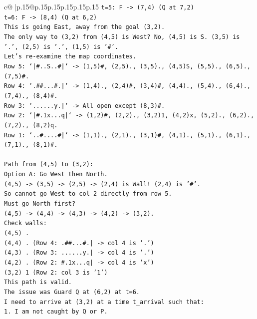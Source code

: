 \documentclass{article}
\begin{document}
{\begin{supertabular}{c@{$\;$}|p{.15\linewidth}@{}p{.15\linewidth}p{.15\linewidth}p{.15\linewidth}p{.15\linewidth}p{.15\linewidth}}
{{{\texttt{t=5: F {-}> (7,4) (Q at 7,2)} \\
\texttt{t=6: F {-}> (8,4) (Q at 6,2)} \\
\texttt{This is going East, away from the goal (3,2).} \\
\texttt{The only way to (3,2) from (4,5) is West? No, (4,5) is S. (3,5) is '.', (2,5) is '.', (1,5) is '\#'.} \\
\texttt{Let's re{-}examine the map coordinates.} \\
\texttt{Row 5: `|\#..S..\#|` {-}> (1,5)\#, (2,5)., (3,5)., (4,5)S, (5,5)., (6,5)., (7,5)\#.} \\
\texttt{Row 4: `.\#\#...\#.|` {-}> (1,4)., (2,4)\#, (3,4)\#, (4,4)., (5,4)., (6,4)., (7,4)., (8,4)\#.} \\
\texttt{Row 3: `......y.|` {-}> All open except (8,3)\#.} \\
\texttt{Row 2: `|\#.1x...q|` {-}> (1,2)\#, (2,2)., (3,2)1, (4,2)x, (5,2)., (6,2)., (7,2)., (8,2)q.} \\
\texttt{Row 1: `..\#....\#|` {-}> (1,1)., (2,1)., (3,1)\#, (4,1)., (5,1)., (6,1)., (7,1)., (8,1)\#.} \\
\\ 
\texttt{Path from (4,5) to (3,2):} \\
\texttt{Option A: Go West then North.} \\
\texttt{(4,5) {-}> (3,5) {-}> (2,5) {-}> (2,4) is Wall! (2,4) is '\#'.} \\
\texttt{So cannot go West to col 2 directly from row 5.} \\
\texttt{Must go North first?} \\
\texttt{(4,5) {-}> (4,4) {-}> (4,3) {-}> (4,2) {-}> (3,2).} \\
\texttt{Check walls:} \\
\texttt{(4,5) .} \\
\texttt{(4,4) . (Row 4: .\#\#...\#.| {-}> col 4 is '.')} \\
\texttt{(4,3) . (Row 3: ......y.| {-}> col 4 is '.')} \\
\texttt{(4,2) . (Row 2: \#.1x...q| {-}> col 4 is 'x')} \\
\texttt{(3,2) 1 (Row 2: col 3 is '1')} \\
\texttt{This path is valid.} \\
\texttt{The issue was Guard Q at (6,2) at t=6.} \\
\texttt{I need to arrive at (3,2) at a time t\_arrival such that:} \\
\texttt{1. I am not caught by Q or P.} \\
}}}
\end{supertabular}}
\end{document}
